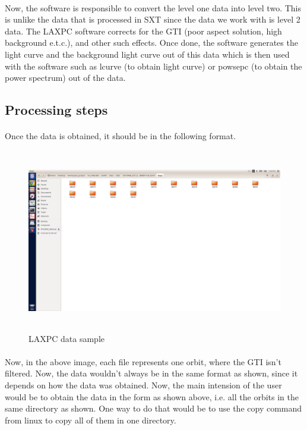 \documentclass[a4paper,twoside]{report}
\numberwithin{equation}{section}
\begin{document}
\paragraph{}
Now, the software is responsible to convert the level one data into level two. This is unlike the data that is processed in SXT since the data we work with is level 2 data. The LAXPC software corrects for the GTI (poor aspect solution, high background e.t.c.), and other such effects. Once done, the software generates the light curve and the background light curve out of this data which is then used with the software such as lcurve (to obtain light curve) or powsepc (to obtain the power spectrum) out of the data. 
\subsection{Processing steps}
\paragraph{}
Once the data is obtained, it should be in the following format. 
\begin{figure}[h]
\includegraphics[width=1.0\linewidth, height=8cm]{Screenshot_from_018-02-03_13-36-32.png}
\caption{LAXPC data sample}
\label{LAXPC_data_sample}
\end{figure}
\paragraph{}
Now, in the above image, each file represents one orbit, where the GTI isn't filtered. Now, the data wouldn't always be in the same format as shown, since it depends on how the data was obtained. Now, the main intension of the user would be to obtain the data in the form as shown above, i.e. all the orbits in the same directory as shown. One way to do that would be to use the copy command from linux to copy all of them in one directory.
\end{document}
